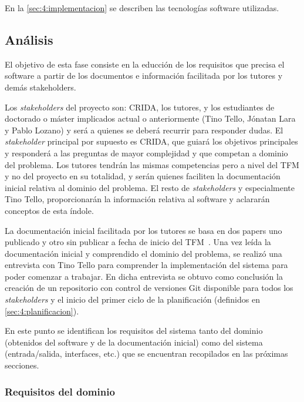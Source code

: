 En la \autoref{sec:4:implementacion} se describen las tecnologías software utilizadas. %


\subsection{Análisis}
El objetivo de esta fase consiste en la educción de los requisitos que precisa el software a partir de los documentos e información facilitada por los tutores y demás stakeholders.

Los \textit{stakeholders} del proyecto son: CRIDA, los tutores, y los estudiantes de doctorado o máster implicados actual o anteriormente (Tino Tello, Jónatan Lara y Pablo Lozano) y será a quienes se deberá recurrir para responder dudas. El \textit{stakeholder} principal por supuesto es CRIDA, que guiará los objetivos principales y responderá a las preguntas de mayor complejidad y que competan a dominio del problema. Los tutores tendrán las mismas competencias pero a nivel del TFM y no del proyecto en su totalidad, y serán quienes faciliten la documentación inicial relativa al dominio del problema. El resto de \textit{stakeholders} y especialmente Tino Tello, proporcionarán la información relativa al software y aclararán conceptos de esta índole.

La documentación inicial facilitada por los tutores se basa en dos papers uno publicado y otro sin publicar a fecha de inicio del TFM~\cite{articulo1, articulo2}. Una vez leída la documentación inicial y comprendido el dominio del problema, se realizó una entrevista con Tino Tello para comprender la implementación del sistema \legacy{} para poder comenzar a trabajar. En dicha entrevista se obtuvo como conclusión la creación de un repositorio con control de versiones Git disponible para todos los \textit{stakeholders} y el inicio del primer ciclo de la planificación (definidos en \autoref{sec:4:planificacion}).

En este punto se identifican los requisitos del sistema tanto del dominio (obtenidos del software \legacy{} y de la documentación inicial) como del sistema (entrada/salida, interfaces, etc.) que se encuentran recopilados en las próximas secciones.

\subsubsection{Requisitos del dominio}
\label{sec:4:RD}

